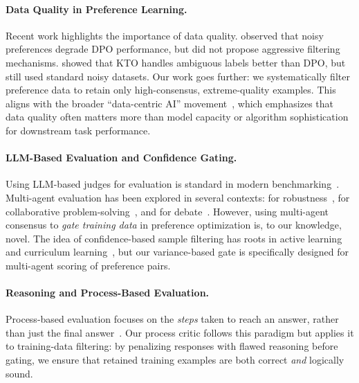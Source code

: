 \documentclass{article}
\begin{document}
\paragraph{Data Quality in Preference Learning.}
Recent work highlights the importance of data quality.
\cite{rafailov2023dpo} observed that noisy preferences degrade DPO performance, but did not propose aggressive filtering mechanisms.
\cite{ethayarajh2024kto} showed that KTO handles ambiguous labels better than DPO, but still used standard noisy datasets.
Our work goes further: we systematically filter preference data to retain only high-consensus, extreme-quality examples.
This aligns with the broader ``data-centric AI'' movement~\cite{andrychowicz2020learning}, which emphasizes that data quality often matters more than model capacity or algorithm sophistication for downstream task performance.

\paragraph{LLM-Based Evaluation and Confidence Gating.}
Using LLM-based judges for evaluation is standard in modern benchmarking~\cite{zheng2024judging,li2023alpacaeval}.
Multi-agent evaluation has been explored in several contexts: for robustness~\cite{black2024multi}, for collaborative problem-solving~\cite{li2023expert}, and for debate~\cite{irving2018debate}.
However, using multi-agent consensus to \emph{gate training data} in preference optimization is, to our knowledge, novel.
The idea of confidence-based sample filtering has roots in active learning~\cite{settles2009active} and curriculum learning~\cite{bengio2009curriculum}, but our variance-based gate is specifically designed for multi-agent scoring of preference pairs.

\paragraph{Reasoning and Process-Based Evaluation.}
Process-based evaluation focuses on the \emph{steps} taken to reach an answer, rather than just the final answer~\cite{wang2023selfconsistency,cobbe2021training}.
Our process critic follows this paradigm but applies it to training-data filtering: by penalizing responses with flawed reasoning before gating, we ensure that retained training examples are both correct \emph{and} logically sound.

\end{document}
